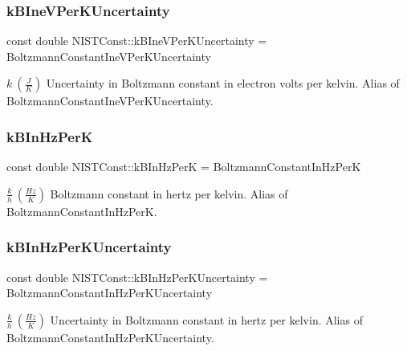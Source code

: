 \subsubsection{\texorpdfstring{k\+B\+Ine\+V\+Per\+K\+Uncertainty}{kBIneVPerKUncertainty}}
{\footnotesize\ttfamily const double N\+I\+S\+T\+Const\+::k\+B\+Ine\+V\+Per\+K\+Uncertainty = Boltzmann\+Constant\+Ine\+V\+Per\+K\+Uncertainty}

$k \ (\frac{J}{K})$ Uncertainty in Boltzmann constant in electron volts per kelvin. Alias of Boltzmann\+Constant\+Ine\+V\+Per\+K\+Uncertainty. \mbox{\label{group___boltzmann_constant_gaa7a3aa5798c9617d09120f8041c93433}} 
\subsubsection{\texorpdfstring{k\+B\+In\+Hz\+PerK}{kBInHzPerK}}
{\footnotesize\ttfamily const double N\+I\+S\+T\+Const\+::k\+B\+In\+Hz\+PerK = Boltzmann\+Constant\+In\+Hz\+PerK}

$\frac{k}{h} \ (\frac{Hz}{K})$ Boltzmann constant in hertz per kelvin. Alias of Boltzmann\+Constant\+In\+Hz\+PerK. \mbox{\label{group___boltzmann_constant_gacee490b0a8b778a3a5f381be776f493e}} 
\subsubsection{\texorpdfstring{k\+B\+In\+Hz\+Per\+K\+Uncertainty}{kBInHzPerKUncertainty}}
{\footnotesize\ttfamily const double N\+I\+S\+T\+Const\+::k\+B\+In\+Hz\+Per\+K\+Uncertainty = Boltzmann\+Constant\+In\+Hz\+Per\+K\+Uncertainty}

$\frac{k}{h} \ (\frac{Hz}{K})$ Uncertainty in Boltzmann constant in hertz per kelvin. Alias of Boltzmann\+Constant\+In\+Hz\+Per\+K\+Uncertainty. \mbox{\label{group___boltzmann_constant_ga54bf445c848dc6dc425076bf6ab45d83}} 
